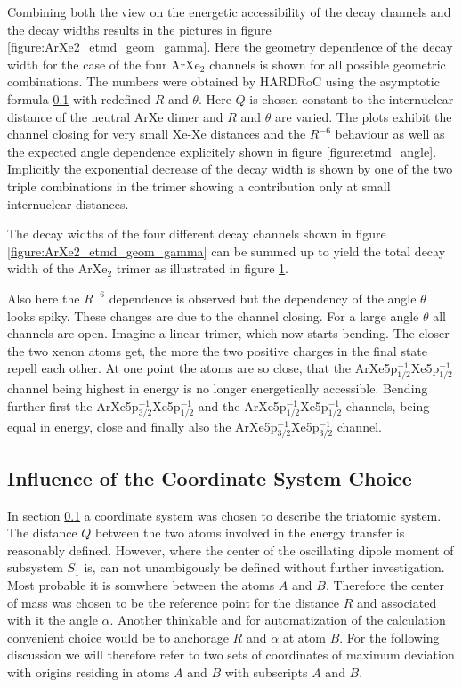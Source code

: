 Combining both the view on the energetic accessibility of the decay
channels and the decay widths results in the pictures in
figure \ref{figure:ArXe2_etmd_geom_gamma}.
Here the geometry dependence of the decay width for the case of the four ArXe$_2$
channels is shown for all possible geometric combinations.
The numbers were obtained by \ac{HARDRoC} using the
asymptotic formula \ref{} with redefined $R$ and $\theta$. Here $Q$ is chosen constant
to the internuclear distance of the neutral ArXe dimer and $R$ and $\theta$
are varied. The plots exhibit the channel closing for very small Xe-Xe distances
and the $R^{-6}$ behaviour as well as the expected angle dependence explicitely
shown in figure \ref{figure:etmd_angle}. Implicitly the exponential decrease
of the decay width is shown by one of the two triple combinations in the trimer
showing a contribution only at small internuclear distances.

The decay widths of the four different decay channels shown in
figure \ref{figure:ArXe2_etmd_geom_gamma} can be summed up to yield
the total decay width of the ArXe$_2$ trimer as illustrated in figure
\ref{figure:ArXe2_etmd_geom_gamma_total}.

\begin{figure}[h]
 \centering
 
 \caption{}
 \label{figure:ArXe2_etmd_geom_gamma_total}
\end{figure}

Also here the $R^{-6}$ dependence is observed but the dependency
of the angle $\theta$ looks spiky. These changes are due to the channel
closing. For a large angle $\theta$ all channels are open. Imagine a linear
trimer, which now starts bending. The closer
the two xenon atoms get, the more the two positive charges in the final
state repell each other. At one point the atoms are so close, that the
ArXe5p$_{1/2}^{-1}$Xe5p$_{1/2}^{-1}$ channel being highest in energy
is no longer energetically accessible. Bending further first the
ArXe5p$_{3/2}^{-1}$Xe5p$_{1/2}^{-1}$ and the
ArXe5p$_{1/2}^{-1}$Xe5p$_{1/2}^{-1}$ channels, being equal in energy,
close and finally also the ArXe5p$_{3/2}^{-1}$Xe5p$_{3/2}^{-1}$
channel.


\subsection{Influence of the Coordinate System Choice}
In section \ref{} a coordinate system was chosen to describe the
triatomic system. The distance $Q$ between the two atoms involved
in the energy transfer is reasonably defined. However, where the
center of the oscillating dipole moment of subsystem $S_1$ is, can
not unambigously be defined without further investigation. Most
probable it is somwhere between the atoms $A$ and $B$. Therefore
the center of mass was chosen to be the reference point for the
distance $R$ and associated with it the angle $\alpha$.
Another thinkable and for automatization of the calculation
convenient choice would be to anchorage $R$ and $\alpha$ at
atom $B$.
For the following discussion we will therefore refer to two sets
of coordinates of maximum deviation with origins residing in atoms
$A$ and $B$ with subscripts $A$ and $B$.

